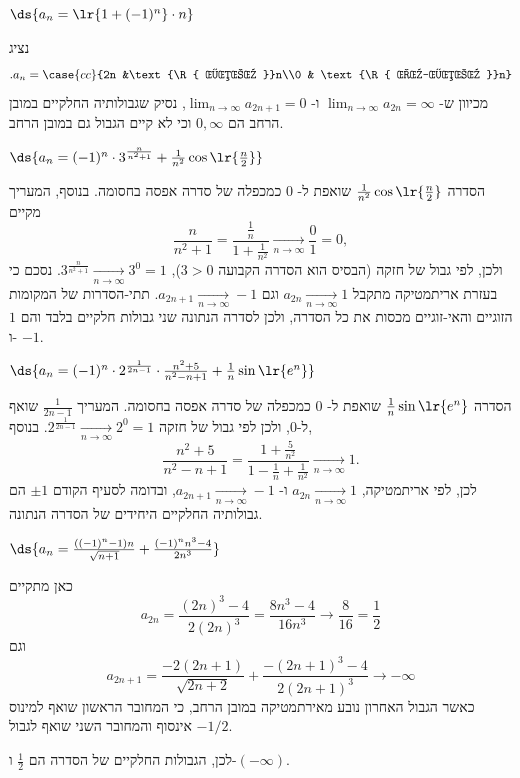  \item $\ds{a_n=\lr{1+(-1)^n}\cdot n}$
\begin{solbox}
נציג
$$.a_n=\case{cc}{2n &\text{\R{ זוגי }}n\\0 & \text{\R{ אי-זוגי }}n}$$
מכיוון ש-
$\displaystyle\lim_{n\to\infty}a_{2n}=\infty$
ו-
$\displaystyle\lim_{n\to \infty}a_{2n+1}=0$,
נסיק
שגבולותיה החלקיים במובן הרחב הם
$0,\infty$
וכי
 לא קיים הגבול גם במובן הרחב.
\end{solbox}
 \item $\ds{a_n=(-1)^n\cdot3^{\frac{n}{n^2+1}}+\frac1{n^2}\cos\lr{\frac{n}2}}$
\begin{solbox}
הסדרה
$\frac1{n^2}\cos\lr{\frac{n}2}$
שואפת ל-
$0$
כמכפלה של סדרה אפסה בחסומה.
בנוסף, המעריך מקיים
$$\frac{n}{n^2+1}=\frac{\frac1n}{1+\frac1{n^2}}\xrightarrow[n\to\infty]{}\frac{0}{1}=0 ,$$
ולכן, לפי גבול של חזקה (הבסיס הוא הסדרה הקבועה $3>0$),
$3^{\frac{n}{n^2+1}}\xrightarrow[n\to\infty]{}3^0=1$.
נסכם כי בעזרת אריתמטיקה מתקבל
$a_{2n}\xrightarrow[n\to\infty]{}1$
וגם
$a_{2n+1}\xrightarrow[n\to\infty]{}-1$.
תתי-הסדרות של המקומות הזוגיים והאי-זוגיים מכסות את כל הסדרה, ולכן לסדרה הנתונה שני גבולות חלקיים בלבד והם
$1$
ו-
$-1$.
\end{solbox}
 \item $\ds{a_n=(-1)^n\cdot2^{\frac1{2n-1}}\cdot\frac{n^2+5}{n^2-n+1}+\frac1{n}\sin\lr{e^n}}$
\begin{solbox}
הסדרה
$\frac1{n}\sin\lr{e^n}$
שואפת ל-
$0$
כמכפלה של סדרה אפסה בחסומה.
המעריך
$\frac{1}{2n-1}$
שואף ל-$0$, ולכן לפי גבול של חזקה
$2^{\frac{1}{2n-1}}\xrightarrow[n\to\infty]{}2^0=1$.
בנוסף,
$$\frac{n^2+5}{n^2-n+1}=\frac{1+\frac5{n^2}}{1-\frac1n+\frac1{n^2}}\xrightarrow[n\to\infty]{}1 .$$
לכן, לפי אריתמטיקה,
$a_{2n}\xrightarrow[n\to\infty]{}1$
ו-
$a_{2n+1}\xrightarrow[n\to\infty]{}-1$,
ובדומה לסעיף הקודם
$\pm1$
הם גבולותיה החלקיים היחידים של הסדרה הנתונה.
\end{solbox}
 \item
 $\ds{a_n=\frac{\left((-1)^n-1\right)n}{\sqrt{n+1}}+
\frac{(-1)^{n}n^3-4}{2n^3}}
$
\begin{solbox}
כאן מתקיים
$$a_{2n}=\frac{(2n)^3-4}{2(2n)^3}=\frac{8n^3-4}{16n^3}\rightarrow \frac{8}{16}=\frac{1}{2}$$
וגם
$$a_{2n+1}=\frac{-2(2n+1)}{\sqrt{2n+2}}+\frac{-(2n+1)^3-4}{2(2n+1)^3}\rightarrow -\infty$$
כאשר הגבול האחרון נובע מאירתמטיקה במובן הרחב, כי המחובר הראשון שואף למינוס אינסוף והמחובר השני שואף לגבול
$-1/2$.

לכן, הגבולות החלקיים של הסדרה הם
$\frac{1}{2}$
ו-$(-\infty)$.
\end{solbox}
\eMs
\eE

